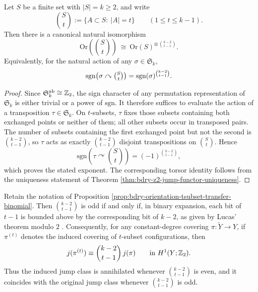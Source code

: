\begin{proposition}\label{prop:bdry-orientation-tsubset-transfer-binomial}
Let \(S\) be a finite set with \(|S|=k\ge 2\), and write
\[
\binom{S}{t}:=\{A\subset S:\ |A|=t\}\qquad(1\le t\le k-1).
\]
Then there is a canonical natural isomorphism
\[
\mathrm{Or}\!\left(\binom{S}{t}\right)\ \cong\ \mathrm{Or}(S)^{\otimes\,\binom{k-2}{t-1}}.
\]
Equivalently, for the natural action of any \(\sigma\in \mathfrak S_k\),
\[
\mathrm{sgn}\bigl(\sigma\curvearrowright \tbinom{S}{t}\bigr)=\mathrm{sgn}(\sigma)^{\binom{k-2}{t-1}}.
\]
\end{proposition}

\begin{proof}
Since \(\mathfrak S_k^{\mathrm{ab}}\cong \mathbb{Z}_2\), the sign character of any permutation representation of \(\mathfrak S_k\) is either trivial or a power of \(\mathrm{sgn}\).
It therefore suffices to evaluate the action of a transposition \(\tau\in\mathfrak S_k\).
On \(t\)-subsets, \(\tau\) fixes those subsets containing both exchanged points or neither of them; all other subsets occur in transposed pairs.
The number of subsets containing the first exchanged point but not the second is \(\binom{k-2}{t-1}\), so \(\tau\) acts as exactly \(\binom{k-2}{t-1}\) disjoint transpositions on \(\binom{S}{t}\).
Hence
\[
\mathrm{sgn}(\tau\curvearrowright \binom{S}{t})=(-1)^{\binom{k-2}{t-1}},
\]
which proves the stated exponent.
The corresponding torsor identity follows from the uniqueness statement of Theorem \ref{thm:bdry-z2-jump-functor-uniqueness}. \qedhere
\end{proof}

\begin{corollary}\label{cor:bdry-orientation-tsubset-lucas-parity}
Retain the notation of Proposition \ref{prop:bdry-orientation-tsubset-transfer-binomial}.
Then \(\binom{k-2}{t-1}\) is odd if and only if, in binary expansion, each bit of \(t-1\) is bounded above by the corresponding bit of \(k-2\), as given by Lucas' theorem modulo \(2\) \cite{lucas1878theorie}.
Consequently, for any constant-degree covering \(\pi:\widetilde Y\to Y\), if \(\pi^{(t)}\) denotes the induced covering of \(t\)-subset configurations, then
\[
j(\pi^{(t)})\equiv \binom{k-2}{t-1}\,j(\pi)\qquad\text{in }H^1(Y;\mathbb{Z}_2).
\]
Thus the induced jump class is annihilated whenever \(\binom{k-2}{t-1}\) is even, and it coincides with the original jump class whenever \(\binom{k-2}{t-1}\) is odd.
\end{corollary}

